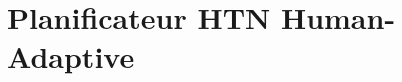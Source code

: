 \documentclass[a4paper,11pt,twoside]{StyleThese}
\begin{document}





\section{Planificateur HTN Human-Adaptive}
\label{sec:planning}

\end{document}
